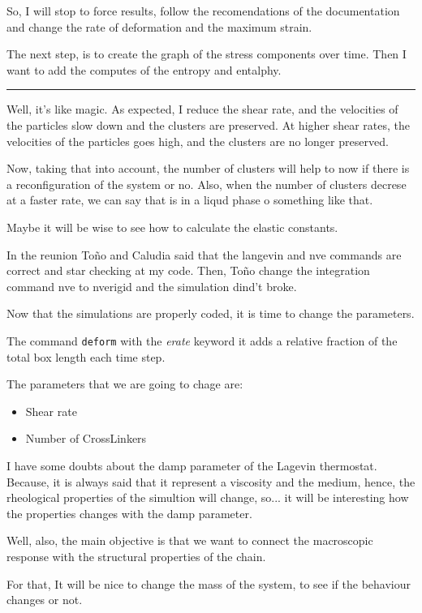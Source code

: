 \documentclass[a4paper, 11pt, oneside]{researchjournal} %
\begin{document}
So, I will stop to force results, follow the recomendations of the documentation and change the rate of deformation and the maximum strain.


The next step, is to create the graph of the stress components over time.
Then I want to add the computes of the entropy and entalphy.

\rule{\textwidth}{0.4pt}

Well, it's like magic.
As expected, I reduce the shear rate, and the velocities of the particles slow down and the clusters are preserved.
At higher shear rates, the velocities of the particles goes high, and the clusters are no longer preserved.

Now, taking that into account, the number of clusters will help to now if there is a reconfiguration of the system or no.
Also, when the number of clusters decrese at a faster rate, we can say that is in a liqud phase o something like that.

Maybe it will be wise to see how to calculate the elastic constants.


In the reunion Toño and Caludia said that the langevin and nve commands are correct and star checking at my code.
Then, Toño change the integration command nve to nve\/rigid and the simulation dind't broke.



Now that the simulations are properly coded, it is time to change the parameters.

The command \verb|deform| with the \textit{erate} keyword it adds a relative fraction of the total box length each time step.

The parameters that we are going to chage are:
\begin{itemize}
	\item Shear rate
	\item Number of CrossLinkers
\end{itemize}

I have some doubts about the damp parameter of the Lagevin thermostat.
Because, it is always said that it represent a viscosity and the medium, hence, the rheological properties of the simultion will change, so... it will be interesting how the properties changes with the damp parameter.

Well, also, the main objective is that we want to connect the macroscopic response with the structural properties of the chain.

For that, It will be nice to change the mass of the system, to see if the behaviour changes or not.
\end{document}
